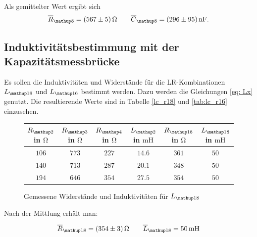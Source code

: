 Als gemittelter Wert ergibt sich
\begin{equation}
\label{eq:wert_r8_c_8}
\overline{R}_{\map{8}}=\SI{567\pm5}{\ohm} \qquad \overline{C}_{\map{8}}=\SI{296\pm95}{\nano\farad}.
\end{equation}

\subsection{Induktivitätsbestimmung mit der Kapazitätsmessbrücke}

Es sollen die Induktivitäten und Widerstände für die LR-Kombinationen $L\ua{18}$ und
$L\ua{16}$ bestimmt werden. Dazu werden die Gleichungen \eqref{eq: Lx} genutzt.
Die resultierende Werte sind in Tabelle \ref{lc_r18} und \ref{tab:lc_r16} einzusehen. %

\begin{figure}
\centering
\caption{Gemessene Widerstände und Induktivitäten für $L\ua{18}$}
  \label{tab:lc_r18}
\begin{tabular}{S S S S S S }
    \toprule
    {$R\ua{2}$ in $\si{\ohm}$} &  {$R\ua{3}$ in $\si{\ohm}$} & {$R\ua{4}$ in $\si{\ohm}$} & {$L\ua{2}$ in $\si{\milli\henry}$}& {$R\ua{18}$ in $\si{\ohm}$} &  {$L\ua{18}$ in $\si{\milli\henry}$} \\
    \midrule
     {$\num{106}$} & {$\num{773}$} &  {$\num{227}$}& {$\num{14,6}$}  &  {$\num{361}$} & {$\num{50}$}\\
     {$\num{140}$} & {$\num{713}$}  & {$\num{287}$} & {$\num{20,1}$} & {$\num{348}$} & {$\num{50}$}\\
     {$\num{194}$} & {$\num{646}$}  & {$\num{354}$} & {$\num{27,5}$} &{$\num{354}$} & {$\num{50}$}  \\
    \bottomrule
  \end{tabular}
 \end{figure}
Nach der Mittlung erhält man:

\begin{equation}
\label{eq:wert_r18_l_18}
\overline{R}_{\map{18}}=\SI{354\pm3}{\ohm} \qquad \overline{L}_{\map{18}}=\SI{50}{\milli\henry}
\end{equation}

